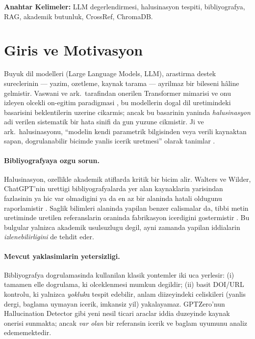 \documentclass[11pt,a4paper]{article}
\begin{document}
\textbf{Anahtar Kelimeler:} LLM degerlendirmesi, halusinasyon tespiti,
bibliyografya, RAG, akademik butunluk, CrossRef, ChromaDB.

\newpage

\section{Giris ve Motivasyon}
\label{sec:giris}

Buyuk dil modelleri (Large Language Models, LLM), arastirma destek
sureclerinin --- yazim, ozetleme, kaynak tarama --- ayrilmaz bir bileseni hâline
gelmistir. Vaswani ve ark.\ tarafindan onerilen Transformer mimarisi
\cite{vaswani2017attention} ve onu izleyen olcekli on-egitim paradigmasi
\cite{devlin2019bert,brown2020gpt3}, bu modellerin dogal dil uretimindeki basarisini
beklentilerin uzerine cikarmis; ancak bu basarinin yaninda \emph{halusinasyon}
adi verilen sistematik bir hata sinifi da gun yuzune cikmistir. Ji ve ark.\
halusinasyonu, ``modelin kendi parametrik bilgisinden veya verili kaynaktan
sapan, dogrulanabilir bicimde yanlis icerik uretmesi'' olarak tanimlar
\cite{ji2023survey}.

\paragraph{Bibliyografyaya ozgu sorun.}
Halusinasyon, ozellikle akademik atiflarda kritik bir bicim alir. Walters ve
Wilder, ChatGPT'nin urettigi bibliyografyalarda yer alan kaynaklarin yarisindan
fazlasinin ya hic var olmadigini ya da en az bir alaninda hatali oldugunu
raporlamistir \cite{walters2023fabrication}. Saglik bilimleri alaninda yapilan
benzer calismalar da, tibbi metin uretiminde uretilen referanslarin %
oraninda fabrikasyon icerdigini gostermistir
\cite{bhattacharyya2023high,athaluri2023exploring}. Bu bulgular yalnizca
akademik usulsuzlugu degil, ayni zamanda yapilan iddialarin
\emph{izlenebilirligini} de tehdit eder.

\paragraph{Mevcut yaklasimlarin yetersizligi.}
Bibliyografya dogrulamasinda kullanilan klasik yontemler iki uca yerlesir:
(i) tamamen elle dogrulama, ki olceklenmesi mumkun degildir; (ii) basit
DOI/URL kontrolu, ki yalnizca \emph{yokluk}u tespit edebilir, anlam diizeyindeki
celiskileri (yanlis dergi, baglama uymayan icerik, imkansiz yil) yakalayamaz.
GPTZero'nun Hallucination Detector gibi yeni nesil ticari araclar iddia
duzeyinde kaynak onerisi sunmakta; ancak \emph{var olan} bir referansin icerik
ve baglam uyumunu analiz edememektedir.
\end{document}
